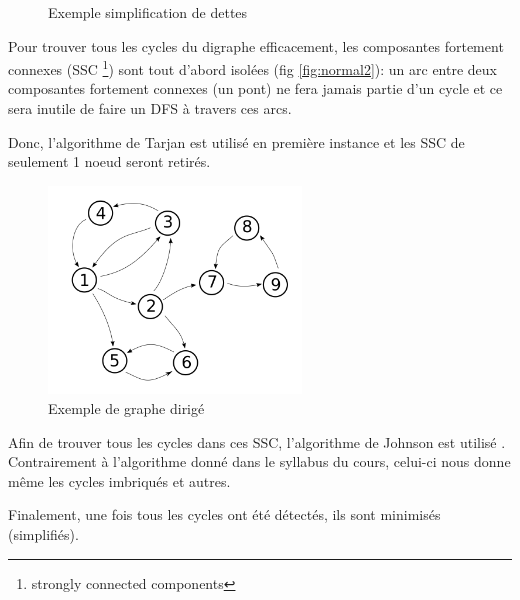 \documentclass[11pt,a4paper]{article}
\begin{document}
\begin{figure}[ht!]  \centering
  \caption{Exemple simplification de dettes}
  \label{fig:simple1}
\end{figure}

Pour trouver tous les cycles du digraphe efficacement, les composantes
fortement connexes (SSC \footnote{strongly connected components}) sont
tout d'abord isolées (fig \ref{fig:normal2}): un arc entre deux
composantes fortement connexes (un pont) ne fera jamais partie d'un
cycle et ce sera inutile de faire un DFS à travers ces arcs.

Donc, l'algorithme de Tarjan est utilisé en première instance et les
SSC de seulement 1 noeud seront retirés.

\begin{figure}[ht!]  \centering
  \includegraphics[width=0.6\textwidth]{graph-only.png}
  \caption{Exemple de graphe dirigé}
  \label{fig:normal1}
\end{figure}

Afin de trouver tous les cycles dans ces SSC, l'algorithme de Johnson
est utilisé \cite{johnson}. Contrairement à l'algorithme donné dans le
syllabus du cours, celui-ci nous donne même les cycles imbriqués et
autres.

Finalement, une fois tous les cycles ont été détectés, ils sont
minimisés (simplifiés).
\end{document}
